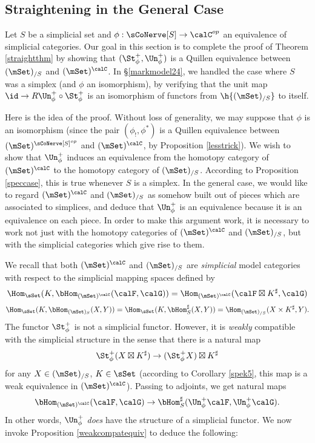 \subsection{Straightening in the General Case}\label{markmodel25}

Let $S$ be a simplicial set and $\phi: \sCoNerve[S] \rightarrow \calC^{op}$ an equivalence of simplicial categories. Our goal in this section is to complete the proof of Theorem \ref{straightthm} by showing that $( \St_{\phi}^{+}, \Un_{\phi}^{+})$ is a Quillen equivalence between
$(\mSet)_{/S}$ and $(\mSet)^{\calC}$. In \S \ref{markmodel24}, we handled the case where $S$ was a simplex (and $\phi$ an isomorphism), by verifying that the unit map
$\id \rightarrow R \Un_{\phi}^{+} \circ \St_{\phi}^{+}$ is an isomorphism of functors
from $\h{(\mSet)_{/S}}$ to itself. 

Here is the idea of the proof.  Without loss of generality, we may suppose that $\phi$ is an isomorphism (since the pair $(\phi_{!}, \phi^{\ast})$ is a Quillen equivalence between $(\mSet)^{ \sCoNerve[S]^{op}}$ and $(\mSet)^{ \calC }$, by Proposition \ref{lesstrick}). We wish to show that $\Un^{+}_{\phi}$
induces an equivalence from the homotopy category of $(\mSet)^{\calC}$ to
the homotopy category of $(\mSet)_{/S}$. According to Proposition \ref{speccase}, this is true
whenever $S$ is a simplex. In the general case, we would like to regard $(\mSet)^{\calC}$
and $(\mSet)_{/S}$ as somehow built out of pieces which are associated to simplices, and deduce that $\Un^{+}_{\phi}$ is an equivalence because it is an equivalence on each piece. In order to make this argument work, it is necessary to work not just with the homotopy categories of
$(\mSet)^{\calC}$ and $(\mSet)_{/S}$, but with the simplicial categories which give rise to them.

We recall that both $(\mSet)^{\calC}$ and $(\mSet)_{/S}$ are {\em simplicial} model categories with respect to the simplicial mapping spaces defined by
$$ \Hom_{\sSet}(K, \bHom_{ (\mSet)^{\calC}}(\calF, \calG)) = \Hom_{(\mSet)^{\calC}}(
\calF \boxtimes K^{\sharp}, \calG)$$
$$ \Hom_{\sSet}(K, \bHom_{(\mSet)_S}(X,Y)) = \Hom_{\sSet}(K, \bHom_{S}^{\sharp}(X,Y))
= \Hom_{(\mSet)_{/S}}(X \times K^{\sharp}, Y).$$
The functor $\St^{+}_{\phi}$ is not a simplicial functor. However, it is {\em weakly} compatible with the simplicial structure in the sense that there is a natural map
$$ \St^{+}_{\phi} (X \boxtimes K^{\sharp}) \rightarrow (\St^{+}_{\phi} X) \boxtimes K^{\sharp}$$
for any $X \in (\mSet)_{/S}$, $K \in \sSet$ (according to Corollary \ref{spek5}, this map is a weak equivalence in $(\mSet)^{\calC}$). Passing to adjoints, we get natural maps
$$ \bHom_{ (\mSet)^{\calC} }( \calF, \calG) \rightarrow \bHom_{S}^{\sharp}( \Un^{+}_{\phi} \calF, \Un^{+}_{\phi} \calG ).$$ In other words, $\Un^{+}_{\phi}$ {\em does} have the structure of a simplicial functor.
We now invoke Proposition \ref{weakcompatequiv} to deduce the following:

